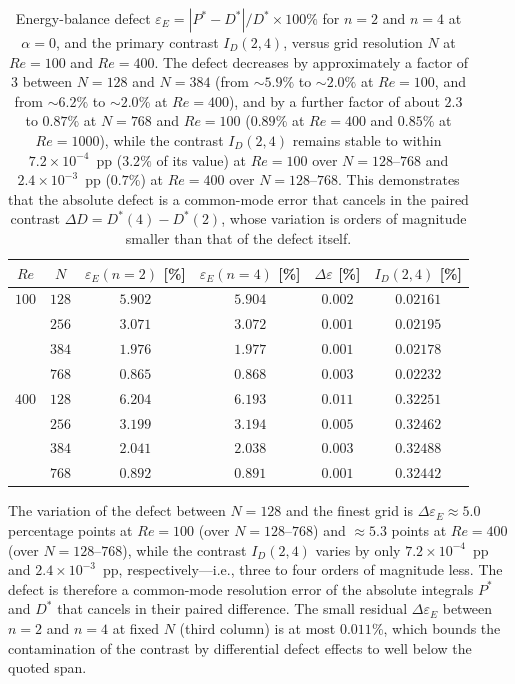 \begin{table}[!htbp]
\centering
\caption{Energy-balance defect $\varepsilon_E = |P^*-D^*|/D^* \times 100\%$ for $n=2$ and $n=4$ at $\alpha=0$, and the primary contrast $I_D(2,4)$, versus grid resolution $N$ at $Re=100$ and $Re=400$. The defect decreases by approximately a factor of 3 between $N=128$ and $N=384$ (from $\sim5.9\%$ to $\sim2.0\%$ at $Re=100$, and from $\sim6.2\%$ to $\sim2.0\%$ at $Re=400$), and by a further factor of about $2.3$ to $0.87\%$ at $N=768$ and $Re=100$ ($0.89\%$ at $Re=400$ and $0.85\%$ at $Re=1000$), while the contrast $I_D(2,4)$ remains stable to within $7.2\times10^{-4}$~pp ($3.2\%$ of its value) at $Re=100$ over $N=128$--$768$ and $2.4\times10^{-3}$~pp ($0.7\%$) at $Re=400$ over $N=128$--$768$. This demonstrates that the absolute defect is a common-mode error that cancels in the paired contrast $\Delta D = D^*(4)-D^*(2)$, whose variation is orders of magnitude smaller than that of the defect itself.}
\label{supptab:defect_vs_contrast}
\begin{tabular}{@{}c|c|cc|cc@{}}
\hline
$Re$ & $N$ & $\varepsilon_E(n{=}2)$ [\%] & $\varepsilon_E(n{=}4)$ [\%] & $\Delta\varepsilon$ [\%] & $I_D(2,4)$ [\%] \\
\hline
$100$ & $128$ & $5.902$ & $5.904$ & $0.002$ & $0.02161$ \\
      & $256$ & $3.071$ & $3.072$ & $0.001$ & $0.02195$ \\
      & $384$ & $1.976$ & $1.977$ & $0.001$ & $0.02178$ \\
      & $768$ & $0.865$ & $0.868$ & $0.003$ & $0.02232$ \\
\hline
$400$ & $128$ & $6.204$ & $6.193$ & $0.011$ & $0.32251$ \\
      & $256$ & $3.199$ & $3.194$ & $0.005$ & $0.32462$ \\
      & $384$ & $2.041$ & $2.038$ & $0.003$ & $0.32488$ \\
      & $768$ & $0.892$ & $0.891$ & $0.001$ & $0.32442$ \\
\hline
\end{tabular}
\end{table}

The variation of the defect between $N=128$ and the finest grid is $\Delta\varepsilon_E \approx 5.0$ percentage points at $Re=100$ (over $N=128$--$768$) and $\approx 5.3$ points at $Re=400$ (over $N=128$--$768$), while the contrast $I_D(2,4)$ varies by only $7.2\times10^{-4}$~pp and $2.4\times10^{-3}$~pp, respectively---i.e., three to four orders of magnitude less. The defect is therefore a common-mode resolution error of the absolute integrals $P^*$ and $D^*$ that cancels in their paired difference. The small residual $\Delta\varepsilon_E$ between $n=2$ and $n=4$ at fixed $N$ (third column) is at most $0.011\%$, which bounds the contamination of the contrast by differential defect effects to well below the quoted span.
